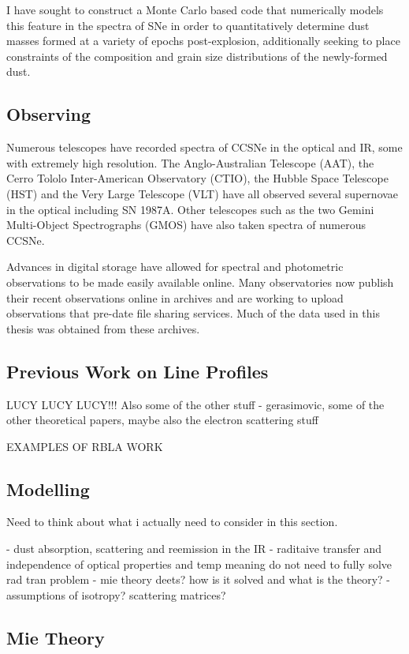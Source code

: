 I have sought to construct a Monte Carlo based code that numerically models this feature in the spectra of SNe in order to quantitatively determine dust masses formed at a variety of epochs post-explosion, additionally seeking to place constraints of the composition and grain size distributions of the newly-formed dust.

\subsection{Observing}

Numerous telescopes have recorded spectra of CCSNe in the optical and IR, some with extremely high resolution.  The Anglo-Australian Telescope (AAT), the Cerro Tololo Inter-American Observatory (CTIO), the Hubble Space Telescope (HST) and the Very Large Telescope (VLT) have all observed several supernovae in the optical including SN 1987A.  Other telescopes such as  the two Gemini Multi-Object Spectrographs (GMOS) have also taken spectra of numerous CCSNe.

Advances in digital storage have allowed for spectral and photometric observations to be made easily available online.  Many observatories now publish their recent observations online in archives and are working to upload observations that pre-date file sharing services.  Much of the data used in this thesis was obtained from these archives. 

\subsection{Previous Work on Line Profiles}
LUCY LUCY LUCY!!!  Also some of the other stuff - gerasimovic, some of the other theoretical papers, maybe also the electron scattering stuff


EXAMPLES OF RBLA WORK
\subsection{Modelling}
Need to think about what i actually need to consider in this section.

- dust absorption, scattering and reemission in the IR
- raditaive transfer and independence of optical properties and temp meaning do not need to fully solve rad tran problem
- mie theory deets?  how is it solved and what is the theory?
- assumptions of isotropy?  scattering matrices?
\subsection{Mie Theory}

